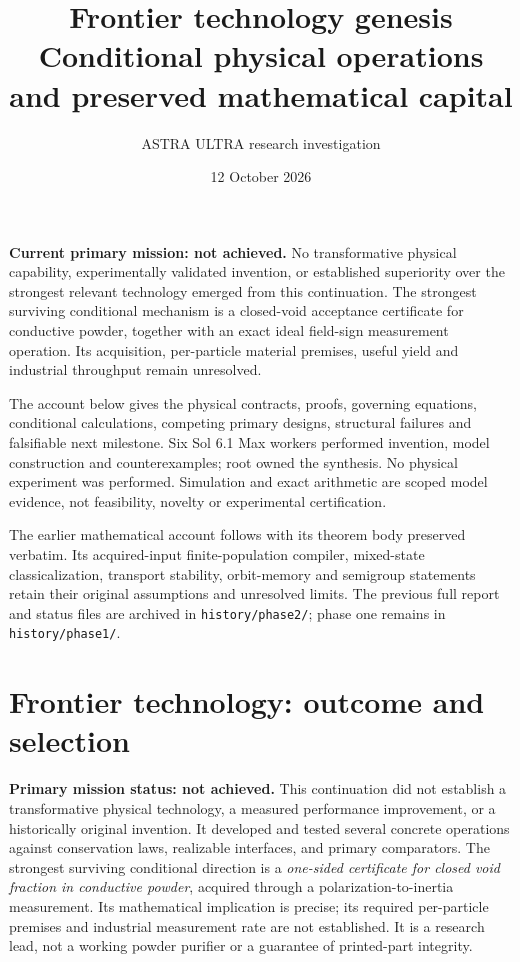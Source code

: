 \documentclass[11pt]{article}
\title{Frontier technology genesis\\Conditional physical operations and preserved mathematical capital}
\author{ASTRA ULTRA research investigation}
\date{12 October 2026}
\begin{document}
\maketitle

\noindent\textbf{Current primary mission: not achieved.}
No transformative physical capability, experimentally validated invention, or
established superiority over the strongest relevant technology emerged from
this continuation. The strongest surviving conditional mechanism is a
closed-void acceptance certificate for conductive powder, together with an
exact ideal field-sign measurement operation. Its acquisition, per-particle
material premises, useful yield and industrial throughput remain unresolved.

The account below gives the physical contracts, proofs, governing equations,
conditional calculations, competing primary designs, structural failures and
falsifiable next milestone. Six Sol 6.1 Max workers performed invention,
model construction and counterexamples; root owned the synthesis. No physical
experiment was performed. Simulation and exact arithmetic are scoped model
evidence, not feasibility, novelty or experimental certification.

The earlier mathematical account follows with its theorem body preserved
verbatim. Its acquired-input finite-population compiler, mixed-state
classicalization, transport stability, orbit-memory and semigroup statements
retain their original assumptions and unresolved limits. The previous full
report and status files are archived in \texttt{history/phase2/}; phase one
remains in \texttt{history/phase1/}.

\tableofcontents

\section{Frontier technology: outcome and selection}\label{sec:technology}

\noindent\textbf{Primary mission status: not achieved.}
This continuation did not establish a transformative physical technology, a measured performance improvement, or a historically original invention. It developed and tested several concrete operations against conservation laws, realizable interfaces, and primary comparators. The strongest surviving conditional direction is a \emph{one-sided certificate for closed void fraction in conductive powder}, acquired through a polarization-to-inertia measurement. Its mathematical implication is precise; its required per-particle premises and industrial measurement rate are not established. It is a research lead, not a working powder purifier or a guarantee of printed-part integrity.
\end{document}
